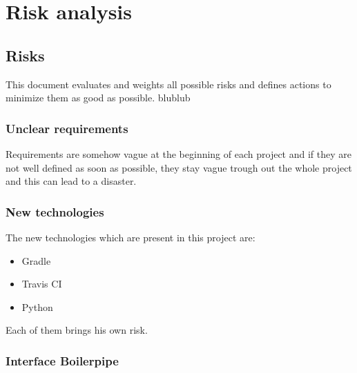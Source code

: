 
\chapter{Risk analysis} %

\label{ChapterX} %



\section{Risks}

This document evaluates and weights all possible risks and defines actions to minimize them as good as possible.
blublub

\subsection{Unclear requirements}

Requirements are somehow vague at the beginning of each project and if they are not well defined as soon as possible, they stay vague trough out the whole project and this can lead to a disaster. 

\subsection{New technologies}

The new technologies which are present in this project are:

 \begin{itemize}
    \item Gradle
    \item Travis CI
    \item Python
\end{itemize}

Each of them brings his own risk.

\subsection{Interface Boilerpipe}

